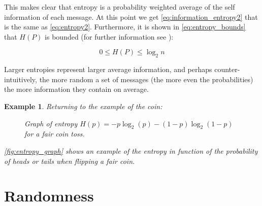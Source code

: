 \documentclass[12pt, a4paper]{report}
\newtheorem{example}{Example}
\begin{document}
This makes clear that entropy is a probability weighted average of the self information of each message.
At this point we get \autoref{eq:information_entropy2} that is the same as \autoref{eq:entropy2}.
Furthermore, it is shown in \autoref{eq:entropy_bounds} that \(H(P)\) is bounded (for further information see
\cite{AnIntroductionToInformationTheoryAndEntropy}):

\begin{equation} \label{eq:entropy_bounds}
  0 \leq H(P) \leq \log_2 n
\end{equation}

Larger entropies represent larger average information, and perhaps counter-intuitively, the more random a set of messages
(the more even the probabilities) the more information they contain on average.

\begin{example}

Returning to the example of the coin:

\begin{figure}[H]
  \centering
    \caption{\label{fig:entropy_graph} Graph of entropy \( H(p) = -p \log_2(p) - (1-p) \log_2(1-p) \) for a fair coin toss.}
\end{figure}

\autoref{fig:entropy_graph} shows an example of the entropy in function of the probability of heads or tails when flipping a fair
coin.

\end{example}

\chapter{Randomness}
\end{document}
